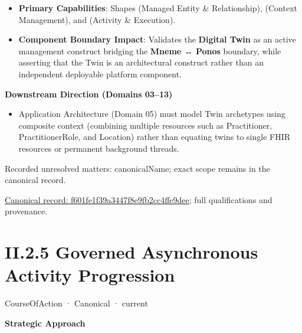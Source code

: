 \begin{itemize}


\item \textbf{Primary Capabilities}: Shapes \texttt{} (Managed Entity \& Relationship), \texttt{} (Context Management), and \texttt{} (Activity \& Execution).

\item \textbf{Component Boundary Impact}: Validates the \textbf{Digital Twin} as an active management construct bridging the \textbf{Mneme ↔ Ponos} boundary, while asserting that the Twin is an architectural construct rather than an independent deployable platform component.

\end{itemize}


\par\medskip\textbf{Downstream Direction (Domains 03–13)}\par


\begin{itemize}


\item Application Architecture (Domain 05) must model Twin archetypes using composite context (combining multiple resources such as Practitioner, PractitionerRole, and Location) rather than equating twins to single FHIR resources or permanent background threads.

\end{itemize}

{\small Recorded unresolved matters: canonicalName; exact scope remains in the canonical record.}\par
{\footnotesize \href{../../../../../../../continuum/strategy/course-of-action/f601fe1f39a3447f8e9fb2cc4ffe9dee.md}{Canonical record: f601fe1f39a3447f8e9fb2cc4ffe9dee}; full qualifications and provenance.}\par
\section*{II.2.5 Governed Asynchronous Activity Progression}
\label{navigation:II.2.5}

\label{element:a8ab09ee29454376bd45ba90b320d6ec}
{\small CourseOfAction · Canonical · current}\par

\par\medskip\textbf{Strategic Approach}\par


